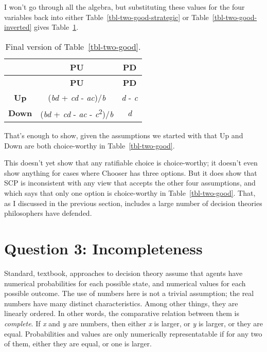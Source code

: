 \documentclass[
  11pt,
  letterpaper,
  DIV=11,
  numbers=noendperiod,
  twoside]{scrartcl}
\begin{document}
I won't go through all the algebra, but substituting these values for
the four variables back into either Table~\ref{tbl-two-good-strategic}
or Table~\ref{tbl-two-good-inverted} gives
Table~\ref{tbl-two-good-final}.

\begin{longtable}[]{@{}ccc@{}}
\caption{Final version of
Table~\ref{tbl-two-good}.}\label{tbl-two-good-final}\tabularnewline
\toprule\noalign{}
& \textbf{PU} & \textbf{PD} \\
\midrule\noalign{}
\endfirsthead
\toprule\noalign{}
& \textbf{PU} & \textbf{PD} \\
\midrule\noalign{}
\endhead
\bottomrule\noalign{}
\endlastfoot
\textbf{Up} & (\emph{bd} + \emph{cd} - \emph{ac})/\emph{b} & \emph{d} -
\emph{c} \\
\textbf{Down} & (\emph{bd} + \emph{cd} - \emph{ac} -
\emph{c}\textsuperscript{2})/\emph{b} & \emph{d} \\
\end{longtable}

That's enough to show, given the assumptions we started with that Up and
Down are both choice-worthy in Table~\ref{tbl-two-good}.

This doesn't yet show that any ratifiable choice is choice-worthy; it
doesn't even show anything for cases where Chooser has three options.
But it does show that SCP is inconsistent with any view that accepts the
other four assumptions, and which says that only one option is
choice-worthy in Table~\ref{tbl-two-good}. That, as I discussed in the
previous section, includes a large number of decision theories
philosophers have defended.

\section{Question 3: Incompleteness}\label{sec-incompleteness}

Standard, textbook, approaches to decision theory assume that agents
have numerical probabilities for each possible state, and numerical
values for each possible outcome. The use of numbers here is not a
trivial assumption; the real numbers have many distinct characteristics.
Among other things, they are linearly ordered. In other words, the
comparative relation between them is \emph{complete}. If \emph{x} and
\emph{y} are numbers, then either \emph{x} is larger, or \emph{y} is
larger, or they are equal. Probabilities and values are only numerically
representatable if for any two of them, either they are equal, or one is
larger.
\end{document}
